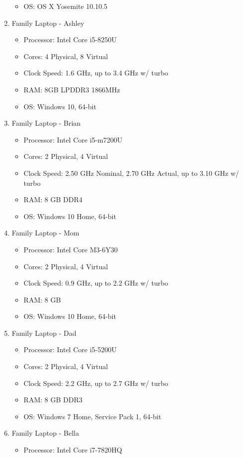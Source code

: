 \documentclass[11pt]{article}
\begin{document}
\begin{enumerate}
{\begin{itemize}
	\item{OS: OS X Yosemite 10.10.5}
	\end{itemize}
	}
\item{Family Laptop - Ashley
	\begin{itemize}
	\item{Processor: Intel Core i5-8250U}
	\item{Cores: 4 Physical, 8 Virtual}
	\item{Clock Speed: 1.6 GHz, up to 3.4 GHz w/ turbo}
	\item{RAM: 8GB LPDDR3 1866MHz}
	\item{OS: Windows 10, 64-bit}
	\end{itemize}
	}
\item{Family Laptop - Brian
	\begin{itemize}
	\item{Processor: Intel Core i5-m7200U}
	\item{Cores: 2 Physical, 4 Virtual}
	\item{Clock Speed: 2.50 GHz Nominal, 2.70 GHz Actual, up to 3.10 GHz w/ turbo}
	\item{RAM: 8 GB DDR4}
	\item{OS: Windows 10 Home, 64-bit}
	\end{itemize}
	}
\item{Family Laptop - Mom
	\begin{itemize}
	\item{Processor: Intel Core M3-6Y30}
	\item{Cores: 2 Physical, 4 Virtual}
	\item{Clock Speed: 0.9 GHz, up to 2.2 GHz w/ turbo}
	\item{RAM: 8 GB}
	\item{OS: Windows 10 Home, 64-bit}
	\end{itemize}
	}
\item{Family Laptop - Dad
	\begin{itemize}
	\item{Processor: Intel Core i5-5200U}
	\item{Cores: 2 Physical, 4 Virtual}
	\item{Clock Speed: 2.2 GHz, up to 2.7 GHz w/ turbo}
	\item{RAM: 8 GB DDR3}
	\item{OS: Windows 7 Home, Service Pack 1, 64-bit}
	\end{itemize}
	}
\item{Family Laptop - Bella 
	\begin{itemize}
	\item{Processor: Intel Core i7-7820HQ}

\end{itemize}}
\end{enumerate}
\end{document}
